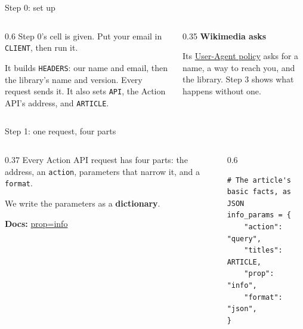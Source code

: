 \documentclass[9pt,aspectratio=169]{beamer}
\begin{document}

\begin{frame}{Step 0: set up}
    \begin{columns}[T]
        \begin{column}{0.6\textwidth}
            Step 0's cell is given. Put your email in \texttt{CLIENT}, then run it.

            \medskip
            It builds \texttt{HEADERS}: our name and email, then the library's name and version. Every request sends it. It also sets \texttt{API}, the Action API's address, and \texttt{ARTICLE}.
        \end{column}
        \begin{column}{0.35\textwidth}
            \textbf{Wikimedia asks}\\[2pt]
            {\footnotesize Its \href{https://foundation.wikimedia.org/wiki/Policy:Wikimedia_Foundation_User-Agent_Policy}{User-Agent policy} asks for a name, a way to reach you, and the library. Step 3 shows what happens without one.\par}
        \end{column}
    \end{columns}
\end{frame}

\begin{frame}[fragile]{Step 1: one request, four parts}
    \begin{columns}[T]
        \begin{column}{0.37\textwidth}
            Every Action API request has four parts: the address, an \texttt{action}, parameters that narrow it, and a \texttt{format}.

            \medskip
            We write the parameters as a \textbf{dictionary}.

            \medskip
            {\scriptsize\textbf{Docs:} \href{https://www.mediawiki.org/wiki/API:Info}{prop=info}\par}
        \end{column}
        \begin{column}{0.6\textwidth}
\begin{lstlisting}
# The article's basic facts, as JSON
info_params = {
    "action": "query",
    "titles": ARTICLE,
    "prop": "info",
    "format": "json",
}
\end{lstlisting}
        \end{column}
    \end{columns}
\end{frame}
\end{document}
